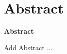 \chapter*{Abstract}
\label{cha:Abstract}
\begin{center}
    \normalfont\huge\bfseries Abstract
\end{center}

Add Abstract ...



